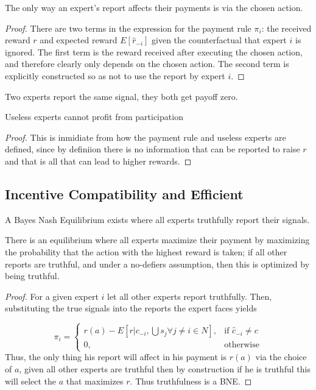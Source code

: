 \begin{lem}
	The only way an expert's report affects their payments is via the chosen action.
\end{lem}

\begin{proof}
There are two terms in the expression for the payment rule $\pi_i$: the received reward $r$ and expected reward $E[\hat{r}_{-i}]$ given the counterfactual that expert $i$ is ignored. 
The first term is the reward received after executing the chosen action, and therefore clearly only depends on the chosen action. 
The second term is explicitly constructed so as not to use the report by expert $i$. 
\end{proof}

\begin{lem}
	Two experts report the same signal, they both get payoff zero. 
\end{lem}




\begin{lem}
	Useless experts cannot profit from participation
\end{lem}

\begin{proof}
This is inmidiate from how the payment rule and useless experts are defined, since by definiion there is no information that can be reported to raise $r$ and that is all that can lead to higher rewards.
\end{proof}

\subsection{Incentive Compatibility and Efficient}

\begin{defn}
	A Bayes Nash Equilibrium exists where all experts truthfully report their signals.
\end{defn}

There is an equilibrium where all experts maximize their payment by maximizing the probability that the action with the highest reward is taken; if all other reports are truthful, and under a no-defiers assumption, then this is optimized by being truthful.

\begin{proof}
For a given expert $i$ let all other experts report truthfully. Then, substituting the true signals into the reports the expert faces yields

\[
    \pi_i = 
\begin{cases}
    r(a) -  E[ r| c_{-i}, \bigcup s_j  \forall j \neq i \in N] ,& \text{if } \hat{c}_{-i} \neq c\\
    0,              & \text{otherwise}
\end{cases}
\]
Thus, the only thing his report will affect in his payment is $r(a)$ via the choice of $a$, given all other experts are truthful then by construction if he is truthful this will select the $a$ that maximizes $r$. Thus truthfulness is a BNE.

\end{proof}

